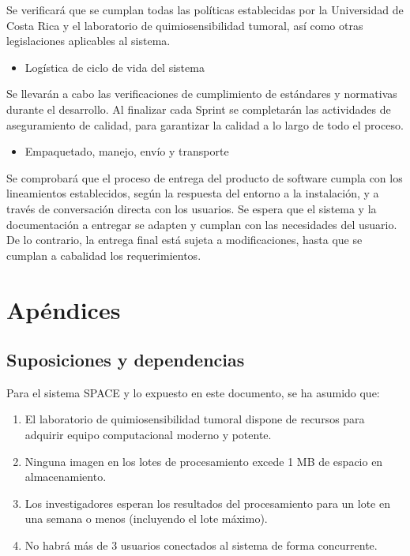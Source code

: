 \documentclass{scrreprt}
\begin{document}
Se verificará que se cumplan todas las políticas establecidas por la Universidad de Costa Rica y el laboratorio de quimiosensibilidad tumoral, así como otras legislaciones aplicables al sistema.

\begin{itemize}
\item Logística de ciclo de vida del sistema
\end{itemize}

Se llevarán a cabo las verificaciones de cumplimiento de estándares y normativas durante el desarrollo. Al finalizar cada Sprint se completarán las actividades de aseguramiento de calidad, para garantizar la calidad a lo largo de todo el proceso. 

\begin{itemize}
\item Empaquetado, manejo, envío y transporte
\end{itemize}

Se comprobará que el proceso de entrega del producto de software cumpla con los lineamientos establecidos, según la respuesta del entorno a la instalación, y a través de conversación directa con los usuarios. Se espera que el sistema y la documentación a entregar se adapten y cumplan con las necesidades del usuario. De lo contrario, la entrega final está sujeta a modificaciones, hasta que se cumplan a cabalidad los requerimientos.


\chapter{Apéndices}

\section{Suposiciones y dependencias}

Para el sistema SPACE y lo expuesto en este documento, se ha asumido que:

\begin{enumerate}[label=\alph*.]
	\item El laboratorio de quimiosensibilidad tumoral dispone de recursos para adquirir equipo computacional moderno y potente.
    \item Ninguna imagen en los lotes de procesamiento excede 1 MB de espacio en almacenamiento.
    \item Los investigadores esperan los resultados del procesamiento para un lote en una semana o menos (incluyendo el lote máximo).
    \item No habrá más de 3 usuarios conectados al sistema de forma concurrente.
\end{enumerate}
\end{document}
